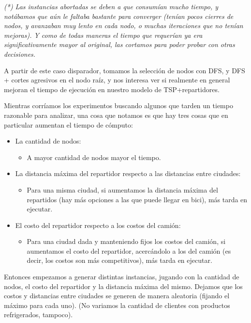 \documentclass{article}
\begin{document}
    \textit{(*) Las instancias abortadas se deben a que consumían mucho tiempo, y notábamos que aún le faltaba bastante para converger (tenían pocos cierres de nodos, y avanzaban muy lento en cada nodo, o muchas iteraciones que no tenían mejoras). Y como de todas maneras el tiempo que requerían ya era significativamente mayor al original, las cortamos para poder probar con otras decisiones.}
    \vspace{3mm}
    
    A partir de este caso disparador, tomamos la selección de nodos con DFS, y DFS + cortes agresivos en el nodo raíz, y nos interesa ver si realmente en general mejoran el tiempo de ejecución en nuestro modelo de TSP+repartidores.

    Mientras corríamos los experimentos buscando algunos que tarden un tiempo razonable para analizar, una cosa que notamos es que hay tres cosas que en particular aumentan el tiempo de cómputo:
    \begin{itemize}
        \item La cantidad de nodos:
        \begin{itemize}
            \item A mayor cantidad de nodos mayor el tiempo.
        \end{itemize}
        
        \item La distancia máxima del repartidor respecto a las distancias entre ciudades:
        \begin{itemize}
            \item Para una misma ciudad, si aumentamos la distancia máxima del repartidos (hay más opciones a las que puede llegar en bici), más tarda en ejecutar.
        \end{itemize}
        
        \item El costo del repartidor respecto a los costos del camión:
        \begin{itemize}
            \item Para una ciudad dada y manteniendo fijos los costos del camión, si aumentamos el costo del repartidor, acercándolo a los del camión  (es decir, los costos son más competitivos), más tarda en ejecutar.
        \end{itemize}
    \end{itemize}

    Entonces empezamos a generar distintas instancias, jugando con la cantidad de nodos, el costo del repartidor y la distancia máxima del mismo. Dejamos que los costos y distancias entre ciudades se generen de manera aleatoria (fijando el máximo para cada uno). (No variamos la cantidad de clientes con productos refrigerados, tampoco).
\end{document}
